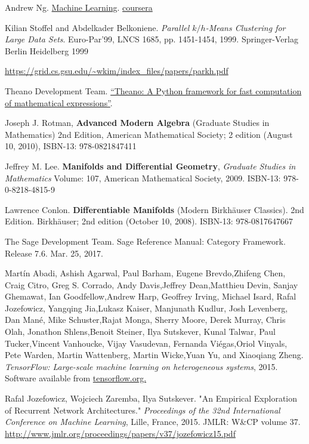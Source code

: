 \documentclass[10pt]{amsart}
\begin{document}
\begin{thebibliography}{9}
Andrew Ng.  \href{https://www.coursera.org/learn/machine-learning/home/welcome}{Machine Learning}.  \href{https://www.coursera.org}{coursera}


Kilian Stoffel and Abdelkader Belkoniene.  \emph{Parallel $k/h$-Means Clustering for Large Data Sets}.  Euro-Par'99, LNCS 1685, pp. 1451-1454, 1999.  Springer-Verlag Berlin Heidelberg 1999

\url{https://grid.cs.gsu.edu/~wkim/index_files/papers/parkh.pdf}

Theano Development Team. \href{http://arxiv.org/pdf/1605.02688.pdf}{“Theano: A Python framework for fast computation of mathematical expressions”}. 

Joseph J. Rotman, \textbf{Advanced Modern Algebra} (Graduate Studies in Mathematics) 2nd Edition, American Mathematical Society; 2 edition (August 10, 2010), ISBN-13: 978-0821847411

Jeffrey M. Lee. \textbf{Manifolds and Differential Geometry}, \emph{Graduate Studies in Mathematics} Volume: 107, American Mathematical Society, 2009. ISBN-13: 978-0-8218-4815-9

Lawrence Conlon.  \textbf{Differentiable Manifolds} (Modern Birkhäuser Classics).  2nd Edition.  Birkhäuser; 2nd edition (October 10, 2008).  ISBN-13: 978-0817647667

The Sage Development Team.  Sage Reference Manual: Category Framework.  Release 7.6.  Mar. 25, 2017.  

Martín Abadi, Ashish Agarwal, Paul Barham, Eugene Brevdo,Zhifeng Chen, Craig Citro, Greg S. Corrado, Andy Davis,Jeffrey Dean,Matthieu Devin, Sanjay Ghemawat, Ian Goodfellow,Andrew Harp, Geoffrey Irving, Michael Isard, Rafal Jozefowicz, Yangqing Jia,Lukasz Kaiser, Manjunath Kudlur, Josh Levenberg, Dan Mané, Mike Schuster,Rajat Monga, Sherry Moore, Derek Murray, Chris Olah, Jonathon Shlens,Benoit Steiner, Ilya Sutskever, Kunal Talwar, Paul Tucker,Vincent Vanhoucke, Vijay Vasudevan, Fernanda Viégas,Oriol Vinyals, Pete Warden, Martin Wattenberg, Martin Wicke,Yuan Yu, and Xiaoqiang Zheng.  
\emph{TensorFlow: Large-scale machine learning on heterogeneous systems}, 2015. Software available from \href{http://tensorflow.org/}{tensorflow.org.}

Rafal Jozefowicz, Wojciech Zaremba, Ilya Sutskever.  "An Empirical Exploration of Recurrent Network Architectures."  \emph{Proceedings of the 32nd
International  Conference on  Machine Learning}, Lille, France, 2015.  JMLR: W\&CP volume 37.  \url{http://www.jmlr.org/proceedings/papers/v37/jozefowicz15.pdf} 


  
\end{thebibliography}
\end{document}
